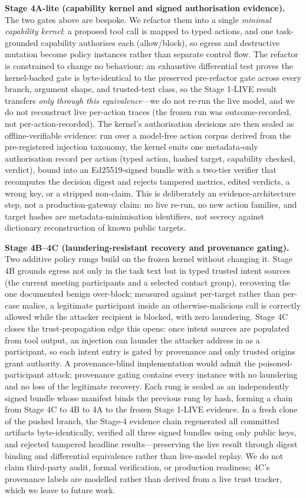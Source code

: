 \documentclass[sigconf,anonymous,review]{acmart}
\begin{document}
\textbf{Stage 4A-lite (capability kernel and signed authorisation evidence).} The two gates above are bespoke. We refactor them into a single \emph{minimal capability kernel}: a proposed tool call is mapped to typed actions, and one task-grounded capability authorises each (allow/block), so egress and destructive mutation become policy instances rather than separate control flow. The refactor is constrained to change no behaviour: an exhaustive differential test proves the kernel-backed gate is byte-identical to the preserved pre-refactor gate across every branch, argument shape, and trusted-text class, so the Stage 1-LIVE result transfers \emph{only through this equivalence}---we do not re-run the live model, and we do not reconstruct live per-action traces (the frozen run was outcome-recorded, not per-action-recorded). The kernel's authorisation decisions are then sealed as offline-verifiable evidence: run over a model-free action corpus derived from the pre-registered injection taxonomy, the kernel emits one metadata-only authorisation record per action (typed action, hashed target, capability checked, verdict), bound into an Ed25519-signed bundle with a two-tier verifier that recomputes the decision digest and rejects tampered metrics, edited verdicts, a wrong key, or a stripped non-claim. This is deliberately an evidence-architecture step, not a production-gateway claim: no live re-run, no new action families, and target hashes are metadata-minimisation identifiers, not secrecy against dictionary reconstruction of known public targets.

\textbf{Stage 4B--4C (laundering-resistant recovery and provenance gating).} Two additive policy rungs build on the frozen kernel without changing it. Stage 4B grounds egress not only in the task text but in typed trusted intent sources (the current meeting participants and a selected contact group), recovering the one documented benign over-block; measured against per-target rather than per-case malice, a legitimate participant inside an otherwise-malicious call is correctly allowed while the attacker recipient is blocked, with zero laundering. Stage 4C closes the trust-propagation edge this opens: once intent sources are populated from tool output, an injection can launder the attacker address in as a participant, so each intent entry is gated by provenance and only trusted origins grant authority. A provenance-blind implementation would admit the poisoned-participant attack; provenance gating contains every instance with no laundering and no loss of the legitimate recovery. Each rung is sealed as an independently signed bundle whose manifest binds the previous rung by hash, forming a chain from Stage 4C to 4B to 4A to the frozen Stage 1-LIVE evidence. In a fresh clone of the pushed branch, the Stage-4 evidence chain regenerated all committed artifacts byte-identically, verified all three signed bundles using only public keys, and rejected tampered headline results---preserving the live result through digest binding and differential equivalence rather than live-model replay. We do not claim third-party audit, formal verification, or production readiness; 4C's provenance labels are modelled rather than derived from a live trust tracker, which we leave to future work.
\end{document}
